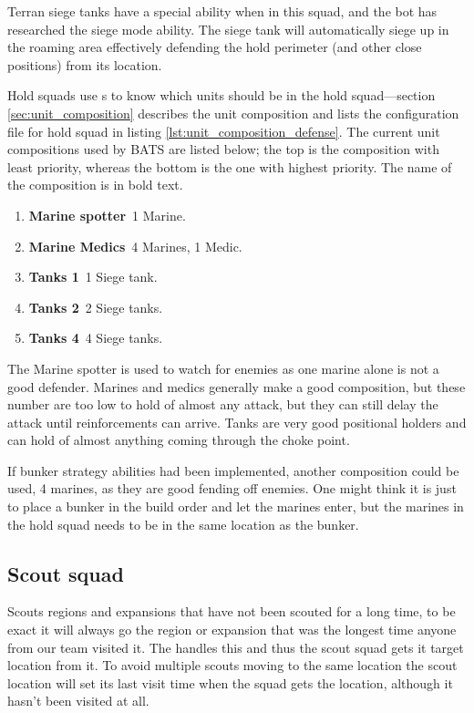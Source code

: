 Terran siege tanks have a special ability when in this squad, and the bot has researched the siege mode ability. The siege tank will automatically siege up in the roaming area effectively defending the hold perimeter (and other close positions) from its location.

Hold squads use s to know which units should be in the hold squad—section \ref{sec:unit_composition} describes the unit composition and lists the configuration file for hold squad in listing \ref{lst:unit_composition_defense}. The current unit compositions used by BATS are listed below; the top is the composition with least priority, whereas the bottom is the one with highest priority. The name of the composition is in bold text.

\begin{enumerate}
	\item \textbf{Marine spotter}~1 Marine.
	\item \textbf{Marine Medics}~4 Marines, 1 Medic.
	\item \textbf{Tanks 1}~1 Siege tank.
	\item \textbf{Tanks 2}~2 Siege tanks.
	\item \textbf{Tanks 4}~4 Siege tanks.
\end{enumerate}
The Marine spotter is used to watch for enemies as one marine alone is not a good defender. Marines and medics generally make a good composition, but these number are too low to hold of almost any attack, but they can still delay the attack until reinforcements can arrive. Tanks are very good positional holders and can hold of almost anything coming through the choke point\cite{day9}. 

If bunker strategy abilities had been implemented, another composition could be used, 4 marines, as they are good fending off enemies. One might think it is just to place a bunker in the build order and let the marines enter, but the marines in the hold squad needs to be in the same location as the bunker.

\subsection{Scout squad}
\label{sec:scout_squad}
Scouts regions and expansions that have not been scouted for a long time, to be exact it will always go the region or expansion that was the longest time anyone from our team visited it. The  handles this and thus the scout squad gets it target location from it. To avoid multiple scouts moving to the same location the scout location will set its last visit time when the squad gets the location, although it hasn't been visited at all.

